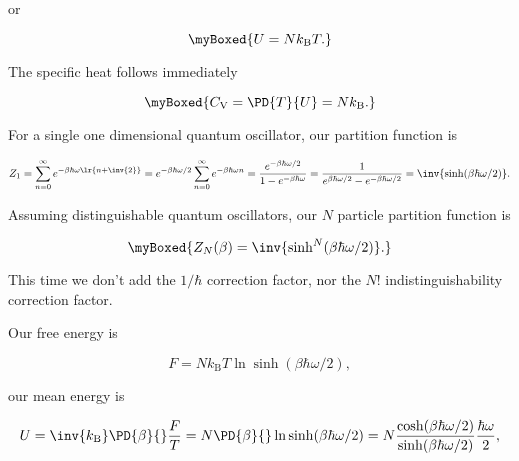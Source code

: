 {or

\begin{equation}\label{eqn:basicStatMechProblemSet5Problem2:160}
\myBoxed{
U = N k_{\mathrm{B}} T.
}
\end{equation}

The specific heat follows immediately

\begin{equation}\label{eqn:basicStatMechProblemSet5Problem2:180}
\myBoxed{
C_{\mathrm{V}} = \PD{T}{U} = N k_{\mathrm{B}}.
}
\end{equation}


For a single one dimensional quantum oscillator, our partition function is

\begin{dmath}\label{eqn:basicStatMechProblemSet5Problem2:200}
Z_1 
= 
\sum_{n = 0}^\infty e^{-\beta \hbar \omega 
\lr{n + \inv{2} }
}
=
e^{-\beta \hbar \omega/2}
\sum_{n = 0}^\infty e^{-\beta \hbar \omega n}
=
\frac{
e^{-\beta \hbar \omega/2}
}{1 - e^{-\beta \hbar \omega}}
=
\frac{1}{e^{\beta \hbar \omega/2} - e^{-\beta \hbar \omega/2}}
= \inv{\sinh(\beta \hbar \omega/2)}.
\end{dmath}

Assuming distinguishable quantum oscillators, our $N$ particle partition function is

\begin{equation}\label{eqn:basicStatMechProblemSet5Problem2:220}
\myBoxed{
Z_N(\beta) 
= \inv{\sinh^N(\beta \hbar \omega/2)}.
}
\end{equation}

This time we don't add the $1/\hbar$ correction factor, nor the $N!$ indistinguishability correction factor.

Our free energy is

\begin{equation}\label{eqn:basicStatMechProblemSet5Problem2:240}
F = N k_{\mathrm{B}} T 
\ln \sinh(\beta \hbar \omega/2)
,
\end{equation}

our mean energy is

\begin{dmath}\label{eqn:basicStatMechProblemSet5Problem2:260}
U 
= \inv{k_{\mathrm{B}}} \PD{\beta}{} \frac{F}{T}
= N \PD{\beta}{}
\ln \sinh(\beta \hbar \omega/2)
= N \frac{\cosh( \beta \hbar \omega/2 )}{
\sinh(\beta \hbar \omega/2)
} \frac{\hbar \omega}{2},
\end{dmath}

}
